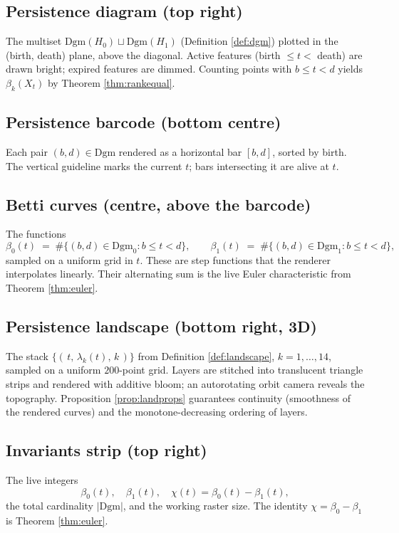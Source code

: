 \documentclass[11pt]{article}
\theoremstyle{persdef}
\newcommand{\X}{X}
\newcommand{\PD}{\mathrm{Dgm}}
\newcommand{\Land}{\lambda}
\newcommand{\Hk}[1]{H_{#1}}
\begin{document}
\subsection*{Persistence diagram (top right)}
The multiset $\PD(\Hk{0})\sqcup\PD(\Hk{1})$ (Definition \ref{def:dgm}) plotted in the (birth, death) plane, above the diagonal. Active features (birth $\leq t <$ death) are drawn bright; expired features are dimmed. Counting points with $b\leq t<d$ yields $\beta_k(\X_t)$ by Theorem \ref{thm:rankequal}.

\subsection*{Persistence barcode (bottom centre)}
Each pair $(b,d)\in\PD$ rendered as a horizontal bar $[b,d]$, sorted by birth. The vertical guideline marks the current $t$; bars intersecting it are alive at $t$.

\subsection*{Betti curves (centre, above the barcode)}
The functions
\[
\beta_0(t) \;=\; \#\{(b,d)\in\PD_0 : b\leq t < d\}, \qquad
\beta_1(t) \;=\; \#\{(b,d)\in\PD_1 : b\leq t < d\},
\]
sampled on a uniform grid in $t$. These are step functions that the renderer interpolates linearly. Their alternating sum is the live Euler characteristic from Theorem \ref{thm:euler}.

\subsection*{Persistence landscape (bottom right, 3D)}
The stack $\{(\,t,\,\Land_k(t),\,k\,)\}$ from Definition \ref{def:landscape}, $k=1,\dots,14$, sampled on a uniform $200$-point grid. Layers are stitched into translucent triangle strips and rendered with additive bloom; an autorotating orbit camera reveals the topography. Proposition \ref{prop:landprops} guarantees continuity (smoothness of the rendered curves) and the monotone-decreasing ordering of layers.

\subsection*{Invariants strip (top right)}
The live integers
\[
\beta_0(t),\quad \beta_1(t),\quad \chi(t) = \beta_0(t)-\beta_1(t),
\]
the total cardinality $|\PD|$, and the working raster size. The identity $\chi=\beta_0-\beta_1$ is Theorem \ref{thm:euler}.
\end{document}
